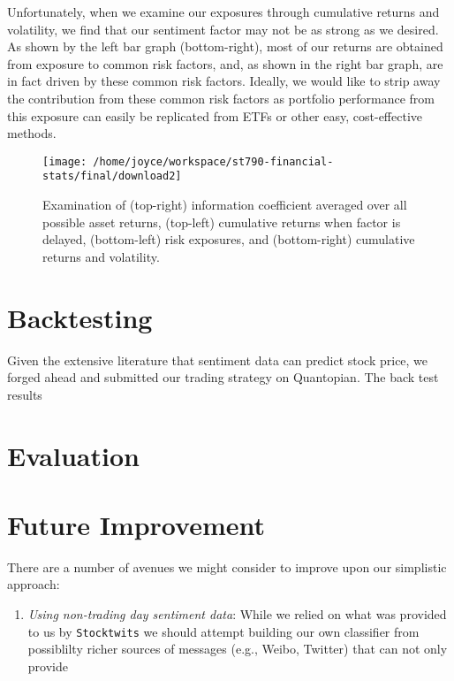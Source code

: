 \documentclass[11pt,]{article}
\providecommand{\tightlist}{%
\setlength{\itemsep}{0pt}\setlength{\parskip}{0pt}}
\begin{document}
Unfortunately, when we examine our exposures through cumulative returns
and volatility, we find that our sentiment factor may not be as strong
as we desired. As shown by the left bar graph (bottom-right), most of
our returns are obtained from exposure to common risk factors, and, as
shown in the right bar graph, are in fact driven by these common risk
factors. Ideally, we would like to strip away the contribution from
these common risk factors as portfolio performance from this exposure
can easily be replicated from ETFs or other easy, cost-effective
methods.

\begin{figure}

{\centering \texttt{[image: /home/joyce/workspace/st790-financial-stats/final/download2]} 

}

\caption{Examination of (top-right) information coefficient averaged over all possible asset returns, (top-left) cumulative returns when factor is delayed, (bottom-left) risk exposures, and (bottom-right) cumulative returns and volatility.}\label{fig:unnamed-chunk-2}
\end{figure}

\newpage 

\section{Backtesting}\label{backtesting}

Given the extensive literature that sentiment data can predict stock
price, we forged ahead and submitted our trading strategy on Quantopian.
The back test results

\section{Evaluation}\label{evaluation}

\section{Future Improvement}\label{future-improvement}

There are a number of avenues we might consider to improve upon our
simplistic approach:

\begin{enumerate}
\def\labelenumi{\arabic{enumi}.}
\tightlist
\item
  \emph{Using non-trading day sentiment data}: While we relied on what
  was provided to us by \texttt{Stocktwits} we should attempt building
  our own classifier from possiblilty richer sources of messages (e.g.,
  Weibo, Twitter) that can not only provide
\end{enumerate}
\end{document}
